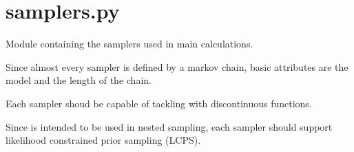 \documentclass[letterpaper,10pt,english,openany,oneside]{sphinxmanual}
\begin{document}
\section{samplers.py}
\label{\detokenize{autogen:module-samplers}}\label{\detokenize{autogen:samplers-py}}
Module containing the samplers used in main calculations.

Since almost every sampler is defined by a markov chain, basic attributes are
the model and the length of the chain.

Each sampler shoud be capable of tackling with discontinuous functions.

Since is intended to be used in nested sampling, each sampler should support likelihood constrained prior sampling (LCPS).
\end{document}
